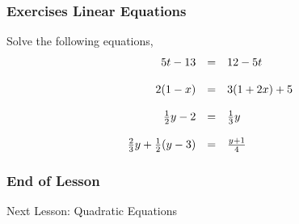 \documentclass[xcolor=dvipsnames]{beamer}
\begin{document}
\begin{frame}
  \frametitle{Exercises Linear Equations}
{\ubung} Solve the following equations,
\begin{equation}
  \label{eq:eiheizie}
  \begin{array}{rcl}
    5t-13&=&12-5t \\ 
    \hspace{.5in} && \\
    2(1-x)&=&3(1+2x)+5 \\ 
    \hspace{.5in} && \\
    \frac{1}{2}y-2&=&\frac{1}{3}y \\ 
    \hspace{.5in} && \\
    \frac{2}{3}y+\frac{1}{2}(y-3)&=&\frac{y+1}{4} \\ 
  \end{array}
\end{equation}
\end{frame}

\begin{frame}
  \frametitle{End of Lesson}
Next Lesson: Quadratic Equations
\end{frame}
\end{document}
